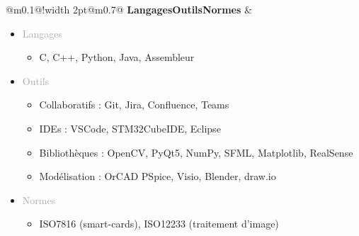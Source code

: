 \documentclass{article}
\begin{document}
\begin{tabular}{@{\hspace{0.05\textwidth}}m{}@{\hspace{0.05\textwidth}}!{\color{secondaryBlue}\vline width 2pt}@{}m{0.7\textwidth}@{}}
    \textcolor{secondaryBlue}{\textbf{Langages\newline Outils\newline Normes}} & 
    \begin{itemize}[label={}, topsep=0pt, partopsep=0pt, itemsep=0.5pt, parsep=2pt] 

        \item \textcolor{darkGray}{Langages}
        \begin{itemize}[label={\textcolor{gray!100}{\checkmark}}, topsep=0pt, partopsep=0pt, itemsep=0.5pt, parsep=2pt] 
            \item \textcolor{gray!100}{C, C++, Python, Java, Assembleur}
        \end{itemize}

        \item \textcolor{darkGray}{Outils}
        \begin{itemize}[label={\textcolor{gray!100}{\checkmark}}, topsep=0pt, partopsep=0pt, itemsep=0.5pt, parsep=2pt]
            \item \textcolor{gray!100}{Collaboratifs : Git, Jira, Confluence, Teams}
            \item \textcolor{gray!100}{IDEs : VSCode, STM32CubeIDE, Eclipse}
            \item \textcolor{gray!100}{Bibliothèques : OpenCV, PyQt5, NumPy, SFML, Matplotlib, RealSense}
            \item \textcolor{gray!100}{Modélisation : OrCAD PSpice, Visio, Blender, draw.io}
        \end{itemize}

        \item \textcolor{darkGray}{Normes}
        \begin{itemize}[label={\textcolor{gray!100}{\checkmark}}, topsep=0pt, partopsep=0pt, itemsep=0.5pt, parsep=2pt, after=\vspace*{-\baselineskip}] 
            \item \textcolor{gray!100}{ISO7816 (smart-cards), ISO12233 (traitement d'image)}
        \end{itemize}
    \end{itemize}
\end{tabular}


\end{document}
